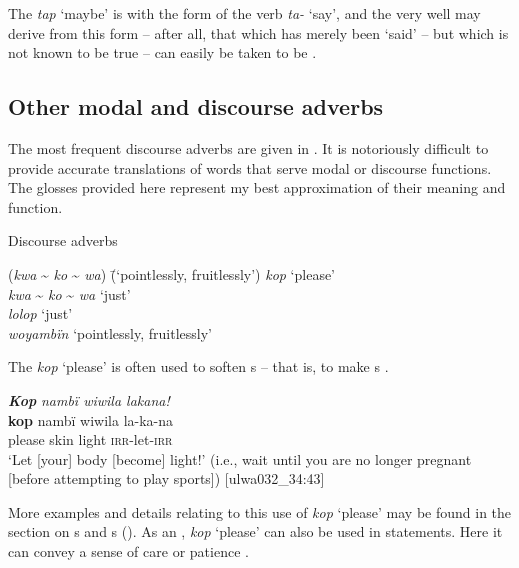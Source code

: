 The  \textit{tap} ‘maybe’ is  with the  form of the verb \textit{ta-} ‘say’, and the  very well may derive from this form -- after all, that which has merely been ‘said’ -- but which is not known to be true -- can easily be taken to be .


\subsection{Other modal and discourse adverbs}\label{sec:8.2.5}


The most frequent discourse adverbs are given in . It is notoriously difficult to provide accurate translations of words that serve modal or discourse functions. The glosses provided here represent my best approximation of their meaning and function.

\ea%
    \label{ex:otherwc:128}
          Discourse adverbs\\
\begin{tabbing}
{(\textit{kwa} {\textasciitilde} \textit{ko} {\textasciitilde} \textit{wa})} \= {(‘pointlessly, fruitlessly’)}\kill
\textit{kop} \> ‘please’\\
\textit{kwa} {\textasciitilde} \textit{ko} {\textasciitilde} \textit{wa} \> ‘just’\\
\textit{lolop} \> ‘just’\\
\textit{woyambïn} \> ‘pointlessly, fruitlessly’
\end{tabbing}
  \z

The  \textit{kop} ‘please’ is often used to soften s -- that is, to make  s .

\ea%
    \label{ex:otherwc:129}
          \textbf{\textit{Kop}} \textit{nambï wiwila lakana!}\\
\gll    \textbf{kop}  nambï  wiwila  la-ka-na\\
    please  skin  light  \textsc{irr-}let-\textsc{irr}\\
\glt `Let [your] body [become] light!’ (i.e., wait until you are no longer pregnant [before attempting to play sports]) [ulwa032\_34:43]
\z

More examples and details relating to this use of \textit{kop} ‘please’ may be found in the section on s and s (). As an , \textit{kop} ‘please’ can also be used in statements. Here it can convey a sense of care or patience .

